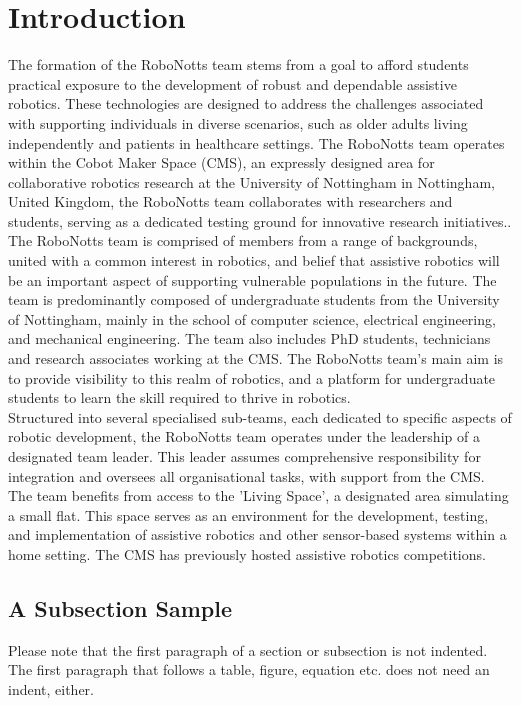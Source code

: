 \section{Introduction}

The formation of the RoboNotts team stems from a goal to afford students practical exposure to the development of robust and dependable assistive robotics. These technologies are designed to address the challenges associated with supporting individuals in diverse scenarios, such as older adults living independently and patients in healthcare settings. The RoboNotts team operates within the Cobot Maker Space (CMS), an expressly designed area for collaborative robotics research at the University of Nottingham in Nottingham, United Kingdom, the RoboNotts team collaborates with researchers and students, serving as a dedicated testing ground for innovative research initiatives..\\

The RoboNotts team is comprised of members from a range of backgrounds, united with a common interest in robotics, and belief that assistive robotics will be an important aspect of supporting vulnerable populations in the future. The team is predominantly composed of undergraduate students from the University of Nottingham, mainly in the school of computer science, electrical engineering, and mechanical engineering. The team also includes PhD students, technicians and research associates working at the CMS. The RoboNotts team's main aim is to provide visibility to this realm of robotics, and a platform for undergraduate students to learn the skill required to thrive in robotics. \\

Structured into several specialised sub-teams, each dedicated to specific aspects of robotic development, the RoboNotts team operates under the leadership of a designated team leader. This leader assumes comprehensive responsibility for integration and oversees all organisational tasks, with support from the CMS. The team benefits from access to the 'Living Space', a designated area simulating a small flat. This space serves as an environment for the development, testing, and implementation of assistive robotics and other sensor-based systems within a home setting. The CMS has previously hosted assistive robotics competitions. 



\subsection{A Subsection Sample}
Please note that the first paragraph of a section or subsection is
not indented. The first paragraph that follows a table, figure,
equation etc. does not need an indent, either.


